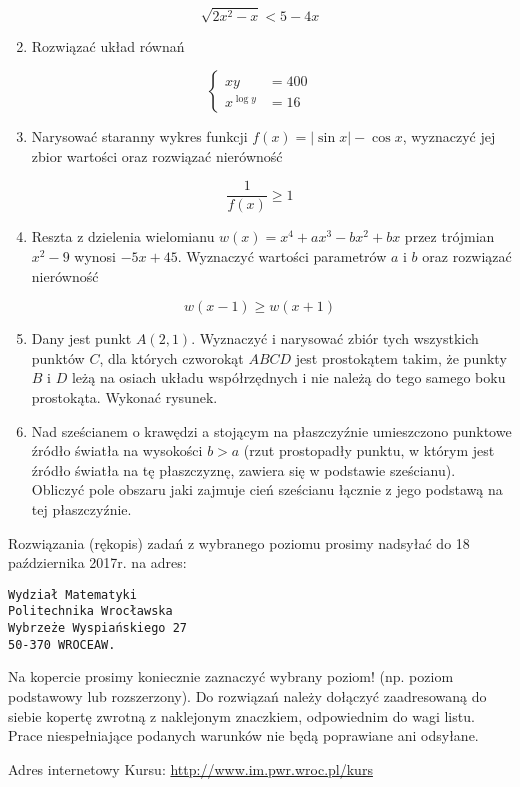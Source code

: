 \documentclass[10pt]{article}
\begin{document}
$$
\sqrt{2 x^{2}-x}<5-4 x
$$

\begin{enumerate}
  \setcounter{enumi}{1}
  \item Rozwiązać układ równań
\end{enumerate}

$$
\left\{\begin{array}{cc}
x y & =400 \\
x^{\log y} & =16
\end{array}\right.
$$

\begin{enumerate}
  \setcounter{enumi}{2}
  \item Narysować staranny wykres funkcji $f(x)=|\sin x|-\cos x$, wyznaczyć jej zbior wartości oraz rozwiązać nierówność
\end{enumerate}

$$
\frac{1}{f(x)} \geqslant 1
$$

\begin{enumerate}
  \setcounter{enumi}{3}
  \item Reszta z dzielenia wielomianu $w(x)=x^{4}+a x^{3}-b x^{2}+b x$ przez trójmian $x^{2}-9$ wynosi $-5 x+45$. Wyznaczyć wartości parametrów $a$ i $b$ oraz rozwiązać nierówność
\end{enumerate}

$$
w(x-1) \geqslant w(x+1)
$$

\begin{enumerate}
  \setcounter{enumi}{4}
  \item Dany jest punkt $A(2,1)$. Wyznaczyć i narysować zbiór tych wszystkich punktów $C$, dla których czworokąt $A B C D$ jest prostokątem takim, że punkty $B$ i $D$ leżą na osiach układu współrzędnych i nie należą do tego samego boku prostokąta. Wykonać rysunek.
  \item Nad sześcianem o krawędzi a stojącym na płaszczyźnie umieszczono punktowe źródło światła na wysokości $b>a$ (rzut prostopadły punktu, w którym jest źródło światła na tę płaszczyznę, zawiera się w podstawie sześcianu). Obliczyć pole obszaru jaki zajmuje cień sześcianu łącznie z jego podstawą na tej płaszczyźnie.
\end{enumerate}

Rozwiązania (rękopis) zadań z wybranego poziomu prosimy nadsyłać do 18 października 2017r. na adres:

\begin{verbatim}
Wydział Matematyki
Politechnika Wrocławska
Wybrzeże Wyspiańskiego 27
50-370 WROCEAW.
\end{verbatim}

Na kopercie prosimy koniecznie zaznaczyć wybrany poziom! (np. poziom podstawowy lub rozszerzony). Do rozwiązań należy dołączyć zaadresowaną do siebie kopertę zwrotną z naklejonym znaczkiem, odpowiednim do wagi listu. Prace niespełniające podanych warunków nie będą poprawiane ani odsyłane.

Adres internetowy Kursu: \href{http://www.im.pwr.wroc.pl/kurs}{http://www.im.pwr.wroc.pl/kurs}
\end{document}
